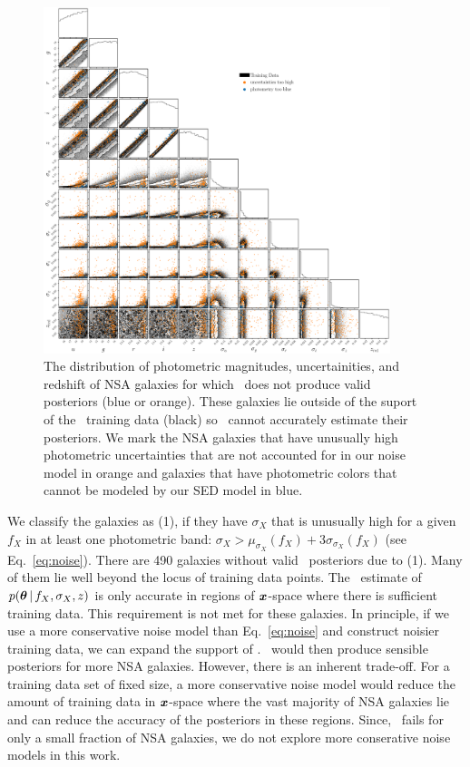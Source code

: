 \begin{figure}
\begin{center}
    \includegraphics[width=0.9\textwidth]{figs/fails.pdf}
    \caption{\label{fig:fail}
    The distribution of photometric magnitudes, uncertainities, and redshift of
    NSA galaxies for which \sedflow~does not produce valid posteriors (blue or
    orange). 
    These galaxies lie outside of the suport of the \sedflow~training data
    (black) so \sedflow~cannot accurately estimate their posteriors. 
    We mark the NSA galaxies that have unusually high photometric uncertainties
    that are not accounted for in our noise model in orange and galaxies that
    have photometric colors that cannot be modeled by our SED model in blue. 
    }
\end{center}
\end{figure}
We classify the galaxies as (1), if they have $\sigma_X$ that is unusually high
for a given $f_X$ in at least one photometric band: 
$\sigma_X > \mu_{\sigma_X}(f_X) + 3 \sigma_{\sigma_X}(f_X)$
(see Eq.~\ref{eq:noise}). 
There are 490 galaxies without valid \sedflow~posteriors due to (1).
Many of them lie well beyond the locus of training data points. 
The \sedflow~estimate of $p(\boldsymbol{\theta} \,|\, f_X, \sigma_X, z)$ is only accurate
in regions of $\textbf{\textit{x}}$-space where there is sufficient training data. 
This requirement is not met for these galaxies.  
In principle, if we use a more conservative noise model than Eq.~\ref{eq:noise}
and construct noisier training data, we can expand the support of \sedflow. 
\sedflow~would then produce sensible posteriors for more NSA galaxies. 
However, there is an inherent trade-off. 
For a training data set of fixed size, a more conservative noise model would
reduce the amount of training data in $\textbf{\textit{x}}$-space where the vast majority
of NSA galaxies lie and can reduce the accuracy of the posteriors in these
regions. 
Since, \sedflow~fails for only a small fraction of NSA galaxies, we do not
explore more conserative noise models in this work.

